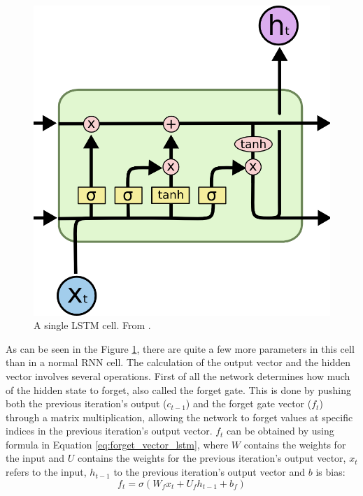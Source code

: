         \begin{figure}[h!]
            \begin{center}
                \includegraphics[scale=0.5]{figs/lstm_cell.png}
            \end{center}
            \caption{A single LSTM cell. From \cite{olah2015understanding}.}
            \label{fig:lstm_cell}
        \end{figure}

        As can be seen in the Figure \ref{fig:lstm_cell}, there are quite a few more parameters in this cell than in a normal RNN cell. 
        The calculation of the output vector and the hidden vector involves several operations.
        First of all the network determines how much of the hidden state to forget, also called the forget gate. 
        This is done by pushing both the previous iteration's output ($c_{t-1}$) and the forget gate vector ($f_t$) through a matrix multiplication, allowing the network to forget values at specific indices in the previous iteration's output vector. 
        $f_t$ can be obtained by using formula in Equation \eqref{eq:forget_vector_lstm}, where $W$ contains the weights for the input and $U$ contains the weights for the previous iteration's output vector, $x_t$ refers to the input, $h_{t-1}$ to the previous iteration's output vector and $b$ is bias:
        \begin{equation}
            f_t = \sigma(W_f x_t + U_f h_{t-1} + b_f)
            \label{eq:forget_vector_lstm}
        \end{equation}

